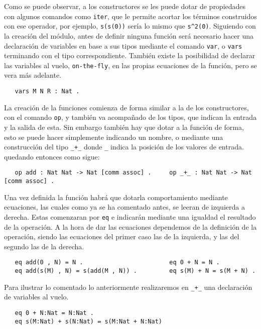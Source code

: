 Como se puede observar, a los constructores se les puede dotar de propiedades con algunos comandos como \texttt{iter}, que le permite acortar los términos construidos con ese operador, por ejemplo, \verb"s(s(0))" sería lo mismo que \verb"s^2(0)". Siguiendo con la creación del módulo, antes de definir ninguna función será necesario hacer una declaración de variables en base a sus tipos mediante el comando \texttt{var}, o \texttt{vars} terminando con el tipo correspondiente. También existe la posibilidad de declarar las variables al vuelo, \texttt{on-the-fly}, en las propias ecuaciones de la función, pero se vera más adelante. \par

{\codesize
\begin{verbatim}
   vars M N R : Nat .
\end{verbatim}
}

La creación de la funciones comienza de forma similar a la de los constructores, con el comando \texttt{op}, y también va acompañado de los tipos, que indican la entrada y la salida de esta. Sin embargo también hay que dotar a la función de forma, esto se puede hacer simplemente indicando un nombre, o mediante una construcción del tipo \verb"_+_" donde \verb"_" indica la posición de los valores de entrada. quedando entonces como sigue: \par

{\codesize
\begin{verbatim}
   op add : Nat Nat -> Nat [comm assoc] .     op _+_ : Nat Nat -> Nat [comm assoc] .
\end{verbatim}
}

Una vez definida la función habrá que dotarla comportamiento mediante ecuaciones, las cuales como ya se ha comentado antes, se leeran de izquierda a derecha. Estas comenzaran por \texttt{eq} e indicarán mediante una igualdad el resultado de la operación. A la hora de dar las ecuaciones dependemos de la definición de la operación, siendo las ecuaciones del primer caso las de la izquierda, y las del segundo las de la derecha. \par
{\codesize
\begin{verbatim}
   eq add(0 , N) = N .                        eq 0 + N = N .
   eq add(s(M) , N) = s(add(M , N)) .         eq s(M) + N = s(M + N) .
\end{verbatim}
}

Para ilustrar lo comentado lo anteriormente realizaremos en \verb"_+_" una declaración de variables al vuelo. \par
{\codesize
\begin{verbatim}
   eq 0 + N:Nat = N:Nat .
   eq s(M:Nat) + s(N:Nat) = s(M:Nat + N:Nat) 
\end{verbatim}
}
 
